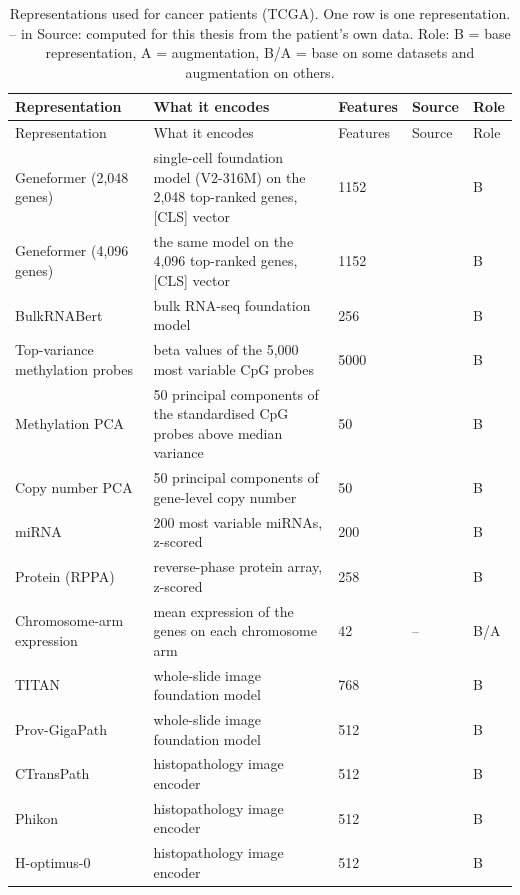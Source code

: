 \begin{longtable}{p{3.2cm}p{5.6cm}p{1.6cm}p{1.6cm}p{1.4cm}}
\caption{Representations used for cancer patients (TCGA). One row is one representation. -- in Source: computed for this thesis from the patient's own data. Role: B = base representation, A = augmentation, B/A = base on some datasets and augmentation on others.}\label{tab:reps_tcga}\\
\toprule
Representation & What it encodes & Features & Source & Role \\
\midrule
\endfirsthead
\toprule
Representation & What it encodes & Features & Source & Role \\
\midrule
\endhead
\bottomrule
\endfoot
Geneformer (2,048 genes) & single-cell foundation model (V2-316M) on the 2,048 top-ranked genes, [CLS] vector & 1152 & \citep{Theodoris2023, Geneformer2024card} & B \\
Geneformer (4,096 genes) & the same model on the 4,096 top-ranked genes, [CLS] vector & 1152 & \citep{Theodoris2023, Geneformer2024card} & B \\
BulkRNABert & bulk RNA-seq foundation model & 256 & \citep{Gelard2024} & B \\
Top-variance methylation probes & beta values of the 5,000 most variable CpG probes & 5000 & \citep{Goldman2020} & B \\
Methylation PCA & 50 principal components of the standardised CpG probes above median variance & 50 & \citep{Goldman2020} & B \\
Copy number PCA & 50 principal components of gene-level copy number & 50 & \citep{Mermel2011} & B \\
miRNA & 200 most variable miRNAs, z-scored & 200 & \citep{Goldman2020} & B \\
Protein (RPPA) & reverse-phase protein array, z-scored & 258 & \citep{Li2013TCPA} & B \\
Chromosome-arm expression & mean expression of the genes on each chromosome arm & 42 & -- & B/A \\
TITAN & whole-slide image foundation model & 768 & \citep{Ding2024TITAN} & B \\
Prov-GigaPath & whole-slide image foundation model & 512 & \citep{Xu2024GigaPath} & B \\
CTransPath & histopathology image encoder & 512 & \citep{Wang2022CTransPath} & B \\
Phikon & histopathology image encoder & 512 & \citep{Filiot2023} & B \\
H-optimus-0 & histopathology image encoder & 512 & \citep{Saillard2024} & B \\

\end{longtable}
